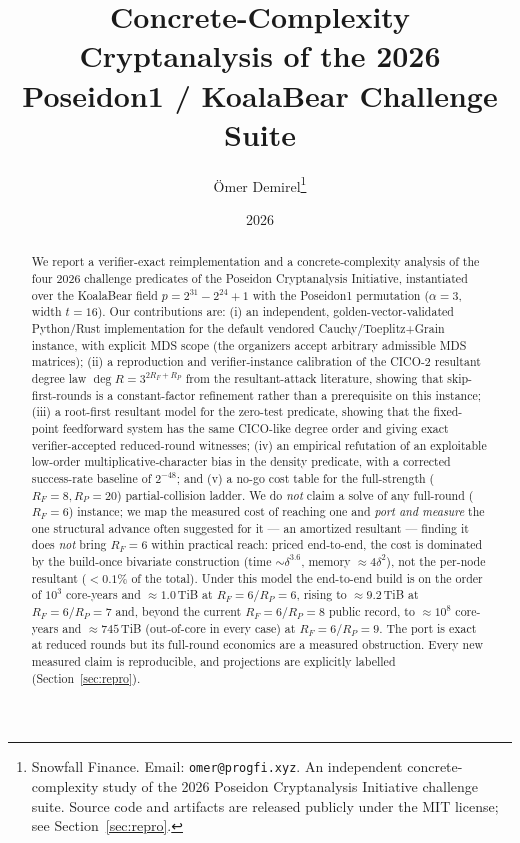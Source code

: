 \documentclass[11pt]{article}
\title{Concrete-Complexity Cryptanalysis of the 2026\\
       Poseidon1 / KoalaBear Challenge Suite}
\author{\"{O}mer Demirel\thanks{Snowfall Finance.
  Email: \texttt{omer@progfi.xyz}. An independent concrete-complexity study of the
  2026 Poseidon Cryptanalysis Initiative challenge suite.
  Source code and artifacts are released publicly under the MIT license; see
  Section~\ref{sec:repro}.}}
\date{2026}
\newcommand{\RF}{R_F}
\newcommand{\RP}{R_P}
\theoremstyle{plain}
\begin{document}
\maketitle

\begin{abstract}
We report a verifier-exact reimplementation and a concrete-complexity analysis of
the four 2026 challenge predicates of the Poseidon Cryptanalysis Initiative,
instantiated over the KoalaBear field $p = 2^{31}-2^{24}+1$ with the Poseidon1
permutation ($\alpha=3$, width $t=16$). Our contributions are: (i) an independent,
golden-vector-validated Python/Rust implementation for the default vendored
Cauchy/Toeplitz+Grain instance, with explicit MDS scope (the organizers accept
arbitrary admissible MDS matrices); (ii) a reproduction and verifier-instance
calibration of the CICO-2 resultant degree law $\deg R = 3^{2\RF+\RP}$ from the
resultant-attack literature, showing that skip-first-rounds is a constant-factor
refinement rather than a prerequisite on this instance; (iii) a root-first
resultant model for the zero-test predicate, showing that the fixed-point
feedforward system has the same CICO-like degree order and giving exact
verifier-accepted reduced-round witnesses; (iv) an empirical refutation of an
exploitable low-order multiplicative-character bias in the density predicate, with
a corrected success-rate baseline of $2^{-48}$; and (v) a no-go cost table for the
full-strength ($\RF=8,\RP=20$) partial-collision ladder. We do \emph{not} claim a
solve of any full-round ($\RF=6$) instance; we map the measured cost of
reaching one and \emph{port and measure} the one structural advance often suggested
for it --- an amortized resultant --- finding it does \emph{not} bring $\RF=6$ within
practical reach: priced end-to-end, the cost is dominated by the build-once bivariate
construction (time $\sim\delta^{3.6}$, memory $\approx 4\delta^2$), not the per-node
resultant ($<0.1\%$ of the total). Under this model the end-to-end build is on the
order of $10^{3}$ core-years and $\approx 1.0$\,TiB at $\RF=6/\RP=6$, rising to
$\approx 9.2$\,TiB at $\RF=6/\RP=7$ and, beyond the current $\RF=6/\RP=8$ public
record, to $\approx 10^{8}$ core-years and $\approx 745$\,TiB (out-of-core in every
case) at $\RF=6/\RP=9$. The port is exact at reduced rounds but its full-round economics
are a measured obstruction.
Every new measured claim is reproducible, and projections are explicitly labelled
(Section~\ref{sec:repro}).
\end{abstract}
\end{document}
